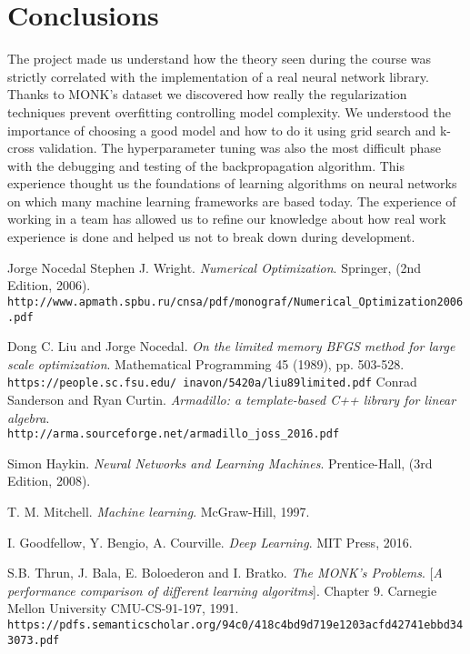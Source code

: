 \section{Conclusions}
The project made us understand how the theory seen during the course was strictly correlated with the implementation of a real neural network library. Thanks to MONK's dataset we discovered how really the regularization techniques prevent overfitting controlling model complexity. We understood the importance of choosing a good model and how to do it using grid search and k-cross validation. The hyperparameter tuning was also the most difficult phase with the debugging and testing of the backpropagation algorithm. This experience thought us the foundations of learning algorithms on neural networks on which many machine learning frameworks are based today. The experience of working in a team has allowed us to refine our knowledge about how real work experience is done and helped us not to break down during development.



\begin{thebibliography}{9}
	
	Jorge Nocedal  Stephen J. Wright.
	\textit{Numerical Optimization}. Springer, (2nd Edition, 2006).
	\\\texttt{http://www.apmath.spbu.ru/cnsa/pdf/monograf/Numerical\_Optimization2006.pdf}

	Dong C. Liu and Jorge Nocedal.
	\textit{On the limited memory BFGS method for large scale optimization}. Mathematical Programming 45 (1989), pp. 503-528.
	\\\texttt{https://people.sc.fsu.edu/~inavon/5420a/liu89limited.pdf}
	Conrad Sanderson and Ryan Curtin. 
	\textit{Armadillo: a template-based C++ library for linear algebra}. 
	\\\texttt{http://arma.sourceforge.net/armadillo\_joss\_2016.pdf}

	
	Simon Haykin. 
	\textit{Neural Networks and Learning Machines}. 
	Prentice-Hall, (3rd Edition, 2008).


	T. M. Mitchell. 
	\textit{Machine learning}. 
	McGraw-Hill, 1997.
	
	I. Goodfellow, Y. Bengio, A. Courville. 
	\textit{Deep Learning}. 
	MIT Press,  2016.
	
	S.B. Thrun, J. Bala, E. Boloederon and I. Bratko.
	\textit{The MONK's Problems}. 
	[\textit{A performance comparison of different learning algoritms}]. Chapter 9.
	Carnegie Mellon University CMU-CS-91-197, 1991.
	\\\texttt{https://pdfs.semanticscholar.org/94c0/418c4bd9d719e1203acfd42741ebbd343073.pdf}
	

	
\end{thebibliography}



